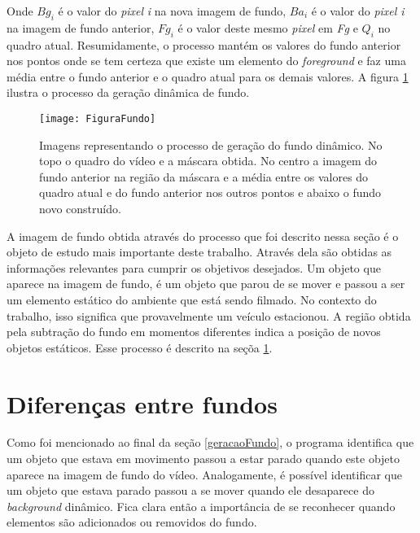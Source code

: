      Onde $Bg_{i}$ é o valor do \textit{pixel} \textit{i} na nova imagem de fundo, $Ba_{i}$ é o valor do \textit{pixel i} na imagem de fundo anterior, $Fg_{i}$ é o valor deste mesmo \textit{pixel} em \textit{Fg} e $Q_{i}$ no quadro atual. Resumidamente, o processo mantém os valores do fundo anterior nos pontos onde se tem certeza que existe um elemento do \textit{foreground} e faz uma média entre o fundo anterior e o quadro atual para os demais valores. A figura \ref{fig:GeracaoFundo} ilustra o processo da geração dinâmica de fundo.


    \begin{figure}
      \texttt{[image: FiguraFundo]}
      \caption{Imagens representando o processo de geração do fundo dinâmico. No topo o quadro do vídeo e a máscara obtida. No centro a imagem do fundo anterior na região da máscara e a média entre os valores do quadro atual e do fundo anterior nos outros pontos e abaixo o fundo novo construído. }\label{fig:GeracaoFundo}
    \end{figure}

    A imagem de fundo obtida através do processo que foi descrito nessa seção é o objeto de estudo mais importante deste trabalho. Através dela são obtidas as informações relevantes para cumprir os objetivos desejados. Um objeto que aparece na imagem de fundo, é um objeto que parou de se mover e passou a ser um elemento estático do ambiente que está sendo filmado. No contexto do trabalho, isso significa que provavelmente um veículo estacionou. A região obtida pela subtração do fundo em momentos diferentes indica a posição de novos objetos estáticos. Esse processo é descrito na seçõa \ref{diferencasFundos}.





\section{Diferenças entre fundos} \label{diferencasFundos}

    Como foi mencionado ao final da seção \ref{geracaoFundo}, o programa identifica que um objeto que estava em movimento passou a estar parado quando este objeto aparece na imagem de fundo do vídeo. Analogamente, é possível identificar que um objeto que estava parado passou a se mover quando ele desaparece do \textit{background} dinâmico. Fica clara então a importância de se reconhecer quando elementos são adicionados ou removidos do fundo.

